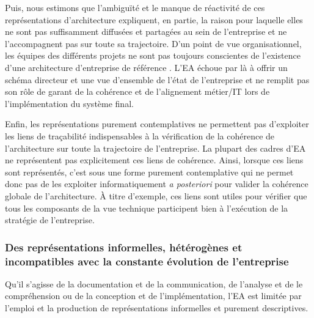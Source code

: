 Puis, nous estimons que l'ambiguïté et le manque de réactivité de ces
représentations d'architecture expliquent, en partie, la raison pour laquelle
elles ne sont pas suffisamment diffusées et partagées au sein de l'entreprise
et ne l'accompagnent pas sur toute sa trajectoire. D'un point de vue
organisationnel, les équipes des différents projets ne sont pas toujours
conscientes de l'existence d'une architecture d'entreprise de référence
\cite{shah2007frameworks}. L'EA échoue par là à offrir un schéma directeur et
une vue d'ensemble de l'état de l'entreprise et ne remplit pas son rôle de
garant de la cohérence et de l'alignement métier/IT lors de l'implémentation du
système final.

Enfin, les représentations purement contemplatives ne permettent pas
d'exploiter les liens de traçabilité indispensables à la vérification de la
cohérence de l'architecture sur toute la trajectoire de l'entreprise. La
plupart des cadres d'EA ne représentent pas explicitement ces liens de
cohérence. Ainsi, lorsque ces liens sont représentés, c'est sous une forme
purement contemplative qui ne permet donc pas de les exploiter informatiquement
\textit{a posteriori} pour valider la cohérence globale de l'architecture. À
titre d'exemple, ces liens sont utiles pour vérifier que tous les composants de
la vue technique participent bien à l'exécution de la stratégie de
l'entreprise.

\subsubsection{Des représentations informelles, hétérogènes et incompatibles avec
la constante évolution de l'entreprise}

Qu'il s'agisse de la documentation et de la communication, de l'analyse et de
le compréhension ou de la conception et de l'implémentation, l'EA est limitée
par l'emploi et la production de représentations informelles et purement
descriptives.

